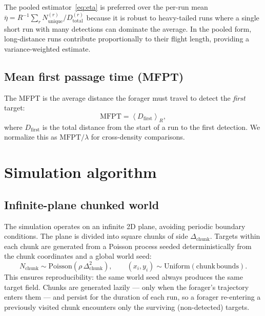 The pooled estimator~\eqref{eq:eta} is preferred over the
per-run mean
$\bar\eta = R^{-1}\sum_r N_{\mathrm{unique}}^{(r)}/D_{\mathrm{total}}^{(r)}$
because it is robust to heavy-tailed runs where a single
short run with many detections can dominate the average.
In the pooled form, long-distance runs contribute
proportionally to their flight length, providing a
variance-weighted estimate.

\subsection{Mean first passage time (MFPT)}

The MFPT is the average distance the forager must travel to
detect the \emph{first} target:
\begin{equation}
  \mathrm{MFPT} = \left\langle D_{\mathrm{first}} \right\rangle_R,
  \label{eq:mfpt_method}
\end{equation}
where $D_{\mathrm{first}}$ is the total distance from the start
of a run to the first detection.  We normalize this as
$\mathrm{MFPT}/\lambda$ for cross-density comparisons.

\section{Simulation algorithm}
\label{sec:algorithm}

\subsection{Infinite-plane chunked world}

The simulation operates on an infinite 2D plane, avoiding
periodic boundary conditions.  The plane is divided into
square chunks of side $\Delta_{\mathrm{chunk}}$.  Targets
within each chunk are generated from a Poisson process
seeded deterministically from the chunk coordinates and a
global world seed:
\begin{equation}
  N_{\mathrm{chunk}} \sim \mathrm{Poisson}(\rho\,\Delta_{\mathrm{chunk}}^2),
  \qquad
  (x_i, y_i) \sim \mathrm{Uniform}(\mathrm{chunk\,bounds}).
\end{equation}
This ensures reproducibility: the same world seed always
produces the same target field.  Chunks are generated lazily
--- only when the forager's trajectory enters them --- and
persist for the duration of each run, so a forager re-entering
a previously visited chunk encounters only the surviving
(non-detected) targets.

